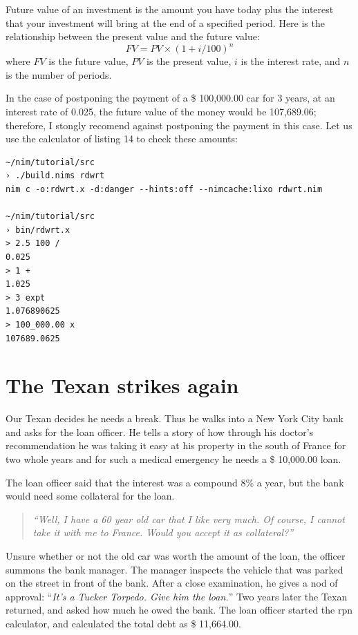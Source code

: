 \documentclass[
  12pt,
]{book}
\begin{document}
Future value of an investment is the amount you have today plus the
interest that your investment will bring at the end of a specified
period. Here is the relationship between the present value and the
future value: \begin{equation}
FV= PV\times (1+i/100)^n
\label{eq:future-value}
\end{equation} where \(FV\) is the future value, \(PV\) is the present
value, \(i\) is the interest rate, and \(n\) is the number of periods.

In the case of postponing the payment of a \$ 100,000.00 car for 3
years, at an interest rate of 0.025, the future value of the money would
be 107,689.06; therefore, I stongly recomend against postponing the
payment in this case. Let us use the calculator of listing 14 to check
these amounts:

\begin{verbatim}
~/nim/tutorial/src
› ./build.nims rdwrt
nim c -o:rdwrt.x -d:danger --hints:off --nimcache:lixo rdwrt.nim

~/nim/tutorial/src
› bin/rdwrt.x
> 2.5 100 /
0.025
> 1 +
1.025
> 3 expt
1.076890625
> 100_000.00 x
107689.0625
\end{verbatim}

\section{The Texan strikes again}\label{the-texan-strikes-again}

Our Texan decides he needs a break. Thus he walks into a New York City
bank and asks for the loan officer. He tells a story of how through his
doctor's recommendation he was taking it easy at his property in the
south of France for two whole years and for such a medical emergency he
needs a \$ 10,000.00 loan.

The loan officer said that the interest was a compound 8\% a year, but
the bank would need some collateral for the loan.

\begin{quote}
\emph{``Well, I have a 60 year old car that I like very much. Of course,
I cannot take it with me to France. Would you accept it as
collateral?''}
\end{quote}

Unsure whether or not the old car was worth the amount of the loan, the
officer summons the bank manager. The manager inspects the vehicle that
was parked on the street in front of the bank. After a close
examination, he gives a nod of approval: ``\emph{It's a Tucker Torpedo.
Give him the loan.}'' Two years later the Texan returned, and asked how
much he owed the bank. The loan officer started the rpn calculator, and
calculated the total debt as \$ 11,664.00.
\end{document}
